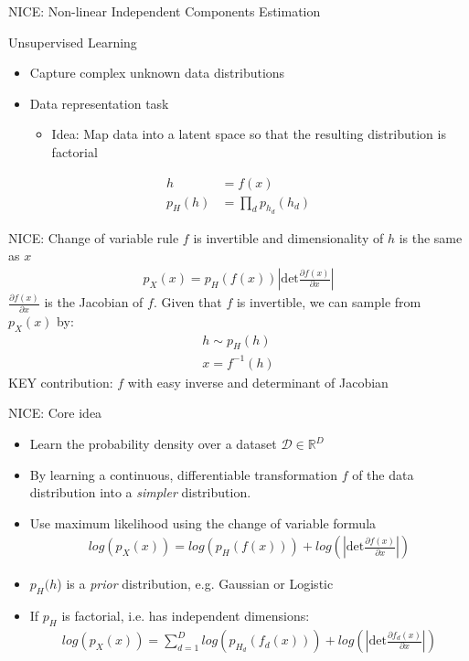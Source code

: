 \begin{frame}{NICE: Non-linear Independent Components Estimation}

Unsupervised Learning
    \begin{itemize}
        \item Capture complex unknown data distributions
        \item Data representation task
        \begin{itemize}
            \item Idea: Map data into a latent space so that the resulting distribution is factorial
        \end{itemize}
    \end{itemize}

\begin{align*}
h &= f(x)    \\
p_H(h) &= \prod_d p_{h_d}(h_d)
\end{align*}
\end{frame}
\begin{frame}{NICE: Change of variable rule}
$f$ is invertible and dimensionality of $h$ is the same as $x$
\begin{align*}
    p_X(x) = p_H(f(x))|\text{det}\frac{\partial f(x)}{\partial x}|
\end{align*}
$\frac{\partial f(x)}{\partial x}$ is the Jacobian of $f$.
\newline
\newline
Given that $f$ is invertible, we can sample from $p_X(x)$ by:
\begin{align*}
    h \sim p_H(h)\\
    x = f^{-1}(h)
\end{align*}
KEY contribution: $f$ with easy inverse and determinant of Jacobian
\end{frame}
\begin{frame}{NICE: Core idea}
\begin{itemize}
\item Learn the probability density over a dataset $\mathcal{D} \in \mathbb{R}^D$
\item By learning a continuous, differentiable transformation $f$ of the data distribution into a \textit{simpler} distribution.
\item Use maximum likelihood using the change of variable formula
\begin{align*}
    log(p_X(x)) = log(p_H(f(x))) + log(|\text{det}\frac{\partial f(x)}{\partial x}|)
\end{align*}
\item $p_H(h$) is a \textit{prior} distribution, e.g. Gaussian or Logistic
\item If $p_H$ is factorial, i.e. has independent dimensions:
\begin{align*}
    log(p_X(x)) = \sum_{d=1}^{D} log(p_{H_d}(f_d(x))) + log(|\text{det}\frac{\partial f_d(x)}{\partial x}|)
\end{align*}
\end{itemize}
\end{frame}
